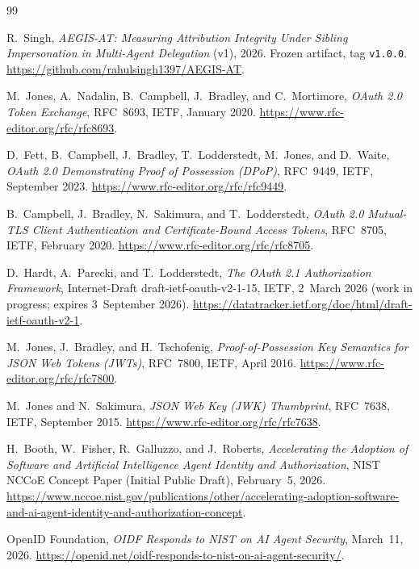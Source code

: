 \documentclass[11pt]{article}
\newcommand{\code}[1]{\texttt{#1}}
\begin{document}
\begin{thebibliography}{99}

 R.~Singh, \emph{AEGIS-AT: Measuring Attribution Integrity
Under Sibling Impersonation in Multi-Agent Delegation} (v1), 2026. Frozen
artifact, tag \code{v1.0.0}.
\url{https://github.com/rahulsingh1397/AEGIS-AT}.

 M.~Jones, A.~Nadalin, B.~Campbell, J.~Bradley, and C.~Mortimore,
\emph{OAuth 2.0 Token Exchange}, RFC~8693, IETF, January 2020.
\url{https://www.rfc-editor.org/rfc/rfc8693}.

 D.~Fett, B.~Campbell, J.~Bradley, T.~Lodderstedt, M.~Jones, and
D.~Waite, \emph{OAuth 2.0 Demonstrating Proof of Possession (DPoP)}, RFC~9449,
IETF, September 2023. \url{https://www.rfc-editor.org/rfc/rfc9449}.

 B.~Campbell, J.~Bradley, N.~Sakimura, and T.~Lodderstedt,
\emph{OAuth 2.0 Mutual-TLS Client Authentication and Certificate-Bound Access
Tokens}, RFC~8705, IETF, February 2020.
\url{https://www.rfc-editor.org/rfc/rfc8705}.

 D.~Hardt, A.~Parecki, and T.~Lodderstedt, \emph{The OAuth 2.1
Authorization Framework}, Internet-Draft draft-ietf-oauth-v2-1-15, IETF,
2~March 2026 (work in progress; expires 3~September 2026).
\url{https://datatracker.ietf.org/doc/html/draft-ietf-oauth-v2-1}.

 M.~Jones, J.~Bradley, and H.~Tschofenig, \emph{Proof-of-Possession
Key Semantics for JSON Web Tokens (JWTs)}, RFC~7800, IETF, April 2016.
\url{https://www.rfc-editor.org/rfc/rfc7800}.

 M.~Jones and N.~Sakimura, \emph{JSON Web Key (JWK) Thumbprint},
RFC~7638, IETF, September 2015. \url{https://www.rfc-editor.org/rfc/rfc7638}.

 H.~Booth, W.~Fisher, R.~Galluzzo, and J.~Roberts,
\emph{Accelerating the Adoption of Software and Artificial Intelligence Agent
Identity and Authorization}, NIST NCCoE Concept Paper (Initial Public Draft),
February~5, 2026.
\url{https://www.nccoe.nist.gov/publications/other/accelerating-adoption-software-and-ai-agent-identity-and-authorization-concept}.

 OpenID Foundation, \emph{OIDF Responds to NIST on AI Agent
Security}, March~11, 2026.
\url{https://openid.net/oidf-responds-to-nist-on-ai-agent-security/}.


\end{thebibliography}
\end{document}
